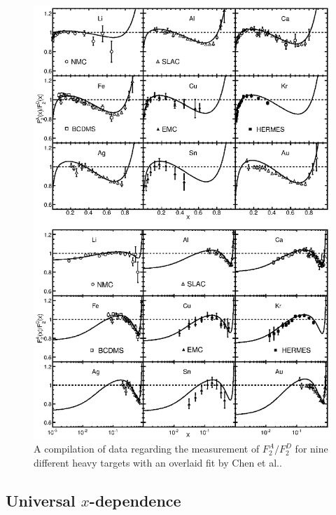 \begin{figure}
	\centering
	\includegraphics[height=0.9\textheight]{figures/background/emc-all-targ.eps}
	\caption{A compilation of data regarding the measurement of $F^A_2/F_2^D$ for nine different heavy targets with an overlaid fit by Chen et al.\cite{Chen:2013oga}.}
	\label{fig:emc-all-targ}
\end{figure}

\subsection{\texorpdfstring{Universal $x$-dependence}{Universal x-dependence}}

